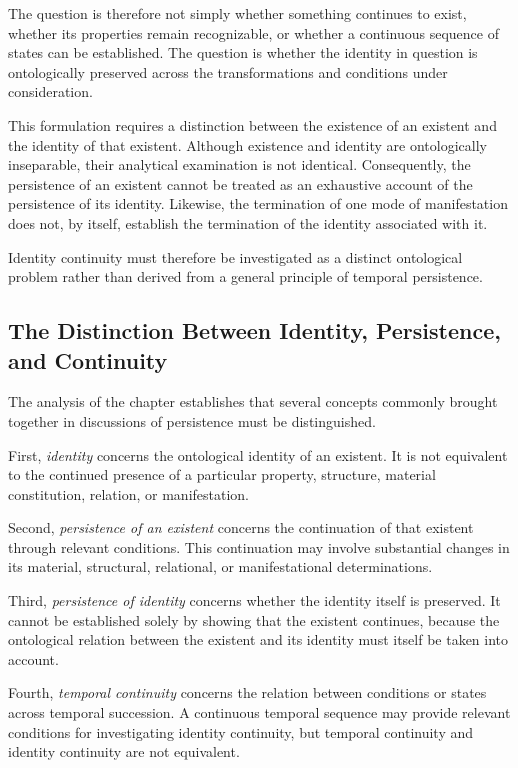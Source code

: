 The question is therefore not simply whether something continues to exist, whether
its properties remain recognizable, or whether a continuous sequence of states
can be established. The question is whether the identity in question is
ontologically preserved across the transformations and conditions under
consideration.

This formulation requires a distinction between the existence of an existent
and the identity of that existent. Although existence and identity are
ontologically inseparable, their analytical examination is not identical.
Consequently, the persistence of an existent cannot be treated as an exhaustive
account of the persistence of its identity. Likewise, the termination of one
mode of manifestation does not, by itself, establish the termination of the
identity associated with it.

Identity continuity must therefore be investigated as a distinct ontological
problem rather than derived from a general principle of temporal persistence.

\subsection{The Distinction Between Identity, Persistence, and Continuity}

The analysis of the chapter establishes that several concepts commonly brought
together in discussions of persistence must be distinguished.

First, \emph{identity} concerns the ontological identity of an existent. It is
not equivalent to the continued presence of a particular property, structure,
material constitution, relation, or manifestation.

Second, \emph{persistence of an existent} concerns the continuation of that
existent through relevant conditions. This continuation may involve substantial
changes in its material, structural, relational, or manifestational
determinations.

Third, \emph{persistence of identity} concerns whether the identity itself is
preserved. It cannot be established solely by showing that the existent
continues, because the ontological relation between the existent and its identity
must itself be taken into account.

Fourth, \emph{temporal continuity} concerns the relation between conditions or
states across temporal succession. A continuous temporal sequence may provide
relevant conditions for investigating identity continuity, but temporal
continuity and identity continuity are not equivalent.

